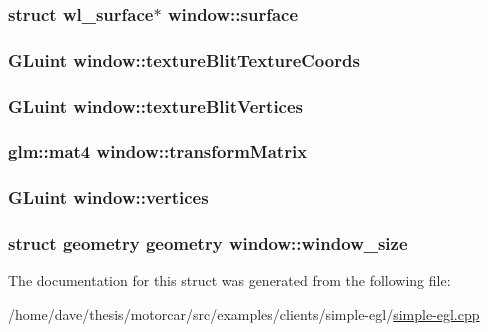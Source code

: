 \hypertarget{structwindow_a7d0790cfc7c30621611fa26ab5c1ae97}{
\subsubsection[{surface}]{\setlength{\rightskip}{0pt plus 5cm}struct wl\-\_\-surface$\ast$ window\-::surface}}\label{structwindow_a7d0790cfc7c30621611fa26ab5c1ae97}
\hypertarget{structwindow_a666b2eb3384260dab74b71b53cf64ae0}{
\subsubsection[{texture\-Blit\-Texture\-Coords}]{\setlength{\rightskip}{0pt plus 5cm}G\-Luint window\-::texture\-Blit\-Texture\-Coords}}\label{structwindow_a666b2eb3384260dab74b71b53cf64ae0}
\hypertarget{structwindow_a38cefb56177a697abbd43518de429a61}{
\subsubsection[{texture\-Blit\-Vertices}]{\setlength{\rightskip}{0pt plus 5cm}G\-Luint window\-::texture\-Blit\-Vertices}}\label{structwindow_a38cefb56177a697abbd43518de429a61}
\hypertarget{structwindow_a2911655817f3e9ec91cd489d36712f9b}{
\subsubsection[{transform\-Matrix}]{\setlength{\rightskip}{0pt plus 5cm}glm\-::mat4 window\-::transform\-Matrix}}\label{structwindow_a2911655817f3e9ec91cd489d36712f9b}
\hypertarget{structwindow_aba37ddff444b6d79b605215db77dfd5d}{
\subsubsection[{vertices}]{\setlength{\rightskip}{0pt plus 5cm}G\-Luint window\-::vertices}}\label{structwindow_aba37ddff444b6d79b605215db77dfd5d}
\hypertarget{structwindow_ad2b6c8ed8044b41fd1189a0ce26d539a}{
\subsubsection[{window\-\_\-size}]{\setlength{\rightskip}{0pt plus 5cm}struct {\bf geometry} {\bf geometry} window\-::window\-\_\-size}}\label{structwindow_ad2b6c8ed8044b41fd1189a0ce26d539a}


The documentation for this struct was generated from the following file\-:\begin{DoxyCompactItemize}
\item 
/home/dave/thesis/motorcar/src/examples/clients/simple-\/egl/\hyperlink{simple-egl_8cpp}{simple-\/egl.\-cpp}\end{DoxyCompactItemize}
